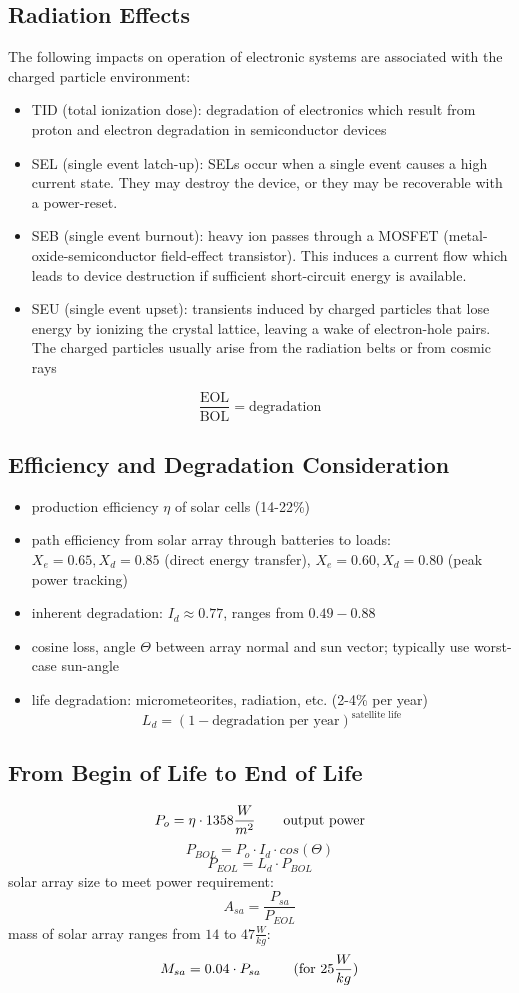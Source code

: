 \subsection{Radiation Effects}
The following impacts on operation of electronic systems are associated with the charged particle environment:
\begin{itemize}
 \item TID (total ionization dose): degradation of electronics which result from proton and electron degradation in semiconductor devices
 \item SEL (single event latch-up): SELs occur when a single event causes a high current state. They may destroy the device, or they may be recoverable with a power-reset.
 \item SEB (single event burnout): heavy ion passes through a MOSFET (metal-oxide-semiconductor field-effect transistor). This induces a current flow which leads to device destruction 
 if sufficient short-circuit energy is available.
 \item SEU (single event upset): transients induced by charged particles that lose energy by ionizing the crystal lattice, leaving a wake of electron-hole pairs. The charged particles 
 usually arise from the radiation belts or from cosmic rays
\end{itemize}
\[\frac{\text{EOL}}{\text{BOL}} = \text{degradation}\]
\subsection{Efficiency and Degradation Consideration}
\begin{itemize}
 \item production efficiency $\eta$ of solar cells (14-22\%)
 \item path efficiency from solar array through batteries to loads: $X_e=0.65, X_d=0.85$ (direct energy transfer), $X_e=0.60, X_d=0.80$ (peak power tracking)
 \item inherent degradation: $I_d \approx 0.77$, ranges from $0.49-0.88$
 \item cosine loss, angle $\Theta$ between array normal and sun vector; typically use worst-case sun-angle
 \item life degradation: micrometeorites, radiation, etc. (2-4\% per year)\[L_d = (1-\text{degradation per year})^{\text{satellite life}}\]
\end{itemize}
\subsection{From Begin of Life to End of Life}
\[P_{o} = \eta\cdot 1358\frac{W}{m^2} \text{\qquad output power}\]
\[P_{BOL} = P_o\cdot I_d\cdot cos(\Theta)\]
\[P_{EOL} = L_d\cdot P_{BOL}\]
solar array size to meet power requirement:
\[A_{sa} = \frac{P_{sa}}{P_{EOL}}\]
mass of solar array ranges from $14$ to $47 \frac{W}{kg}$:
\[M_{sa} = 0.04\cdot P_{sa} \text{ \qquad (for } 25 \frac{W}{kg})\]
